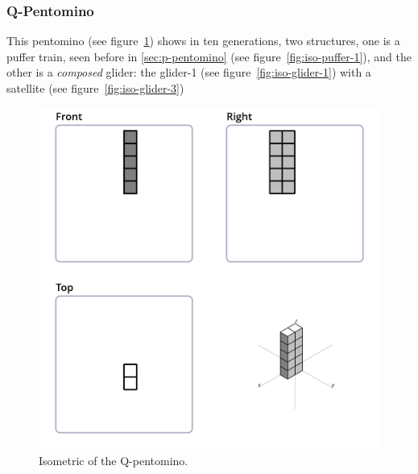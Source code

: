 \subsubsection{Q-Pentomino}
This pentomino (see figure~\ref{fig:iso-pent-q}) shows in ten generations, two
structures, one is a puffer train, seen before in \ref{sec:p-pentomino} (see
figure~\ref{fig:iso-puffer-1}), and the other is a \textit{composed} glider:
the glider-1 (see figure~\ref{fig:iso-glider-1}) with a satellite (see
figure~\ref{fig:iso-glider-3})


\begin{figure}
	\centering
	\includegraphics[scale=0.3]{iso_diagrams/o.png}
	\caption{Isometric of the Q-pentomino.}
  \label{fig:iso-pent-q}
\end{figure}

